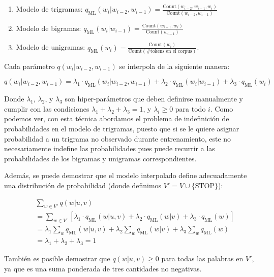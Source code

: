 \begin{enumerate}
    \item Modelo de trigramas: $q_{\text{ML}}(w_i | w_{i-2}, w_{i-1}) = \frac{{\text{Count}(w_{i-2}, w_{i-1}, w_i)}}{{\text{Count}(w_{i-2}, w_{i-1})}}$
    \item Modelo de bigramas: $q_{\text{ML}}(w_i | w_{i-1}) = \frac{{\text{Count}(w_{i-1}, w_i)}}{{\text{Count}(w_{i-1})}}$
    \item Modelo de unigramas: $q_{\text{ML}}(w_i) = \frac{{\text{Count}(w_i)}}{{\text{Count}(\# \text{tokens en el corpus})}}$.
\end{enumerate}

Cada parámetro $q(w_i | w_{i-2}, w_{i-1})$ se interpola de la siguiente manera:

\[
q(w_i | w_{i-2}, w_{i-1}) = \lambda_1 \cdot q_{\text{ML}}(w_i | w_{i-2}, w_{i-1}) + \lambda_2 \cdot q_{\text{ML}}(w_i | w_{i-1}) + \lambda_3 \cdot q_{\text{ML}}(w_i)
\]

Donde $\lambda_1$, $\lambda_2$, y $\lambda_3$ son hiper-parámetros que deben definirse manualmente y cumplir con las condiciones $\lambda_1 + \lambda_2 + \lambda_3 = 1$, y $\lambda_i \geq 0$ para todo $i$. Como podemos ver, con esta técnica abordamos el problema de indefinición de probabilidades en el modelo de trigramas, puesto que si se le quiere asignar probabilidad a un trigrama no observado durante entrenamiento, este no necesariamente indefine las probabilidades pues puede recurrir a las probabilidades de los bigramas y unigramas correspondientes.


Además, se puede demostrar que el modelo interpolado define adecuadamente una distribución de probabilidad (donde definimos $V' = V \cup \{\text{STOP}\}$):

\[
\begin{aligned}
    & \sum_{w \in V'} q(w | u, v) \\
    &= \sum_{w \in V'} [\lambda_1 \cdot q_{\text{ML}}(w | u, v) + \lambda_2 \cdot q_{\text{ML}}(w | v) + \lambda_3 \cdot q_{\text{ML}}(w)] \\
    &= \lambda_1 \sum_{w} q_{\text{ML}}(w | u, v) + \lambda_2 \sum_{w} q_{\text{ML}}(w | v) + \lambda_3 \sum_{w} q_{\text{ML}}(w) \\
    &= \lambda_1 + \lambda_2 + \lambda_3 = 1
\end{aligned}
\]

También es posible demostrar que $q(w | u, v) \geq 0$ para todas las palabras en $V'$, ya que es una suma ponderada de tres cantidades no negativas.



